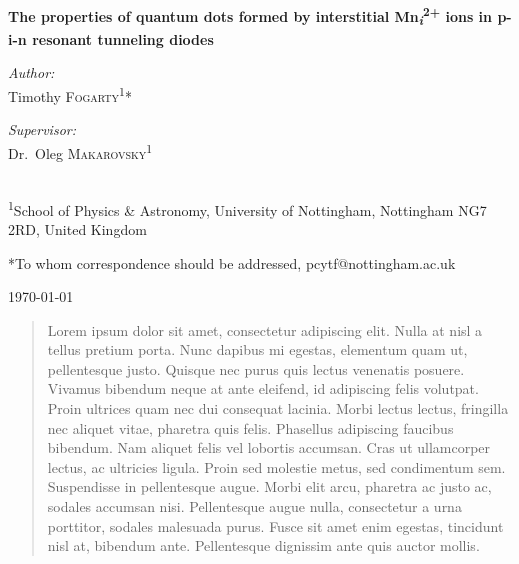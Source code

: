 \documentclass[]{article}
\begin{document}
\begin{titlepage}
\begin{center}

\vspace*{1.0cm} 
{\huge \bfseries The properties of quantum dots formed by interstitial Mn\textsubscript{\emph{i}}\textsuperscript{2+} ions in p-i-n resonant tunneling diodes \\[0.4cm] }
\vspace{0.8cm} 

\begin{minipage}{0.4\textwidth}
\begin{flushleft} \large
\emph{Author:}\\
Timothy \textsc{Fogarty}\textsuperscript{1}* 
\end{flushleft}
\end{minipage}
\begin{minipage}{0.4\textwidth}
\begin{flushright} \large
\emph{Supervisor:} \\
Dr.~Oleg \textsc{Makarovsky}\textsuperscript{1}
\end{flushright}
\end{minipage}
\\[0.8cm]
\textsuperscript{1}School of Physics \& Astronomy, University of Nottingham, Nottingham NG7 2RD, United Kingdom

*To whom correspondence should be addressed, pcytf@nottingham.ac.uk

\vspace{0.8cm} 
{\large \today}
\vspace{0.8cm} 

\begin{abstract}
Lorem ipsum dolor sit amet, consectetur adipiscing elit. Nulla at nisl a tellus pretium porta. Nunc dapibus mi egestas, elementum quam ut, pellentesque justo. Quisque nec purus quis lectus venenatis posuere. Vivamus bibendum neque at ante eleifend, id adipiscing felis volutpat. Proin ultrices quam nec dui consequat lacinia. Morbi lectus lectus, fringilla nec aliquet vitae, pharetra quis felis. Phasellus adipiscing faucibus bibendum. Nam aliquet felis vel lobortis accumsan. Cras ut ullamcorper lectus, ac ultricies ligula. Proin sed molestie metus, sed condimentum sem. Suspendisse in pellentesque augue. Morbi elit arcu, pharetra ac justo ac, sodales accumsan nisi. Pellentesque augue nulla, consectetur a urna porttitor, sodales malesuada purus. Fusce sit amet enim egestas, tincidunt nisl at, bibendum ante. Pellentesque dignissim ante quis auctor mollis.
\end{abstract}

\vfill



\end{center}
\end{titlepage}
\end{document}
